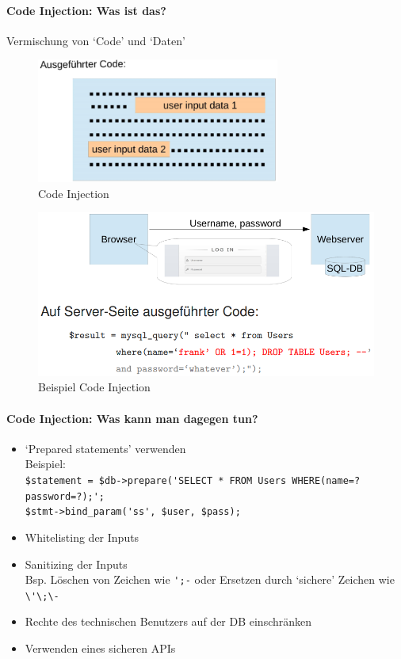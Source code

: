 \documentclass[10pt,a4paper]{article}
\begin{document}
\paragraph*{Code Injection: Was ist das?} Vermischung von `Code' und `Daten'
\begin{figure}[H]
    \begin{center}
    \includegraphics[width=8cm]{images/Code-Injection.png}
    \caption{Code Injection}
    \label{Code Injection}
    \end{center}
\end{figure}

\begin{figure}[H]
    \begin{center}
    \includegraphics[width=12cm]{images/Bsp-Code-Injection.png}
    \caption{Beispiel Code Injection}
    \label{Code Injection example}
    \end{center}
\end{figure}

\paragraph*{Code Injection: Was kann man dagegen tun?}
\begin{itemize}[noitemsep,topsep=0pt,leftmargin=*]
    \item `Prepared statements' verwenden \\ Beispiel:\\
    \verb|$statement = $db->prepare('SELECT * FROM Users WHERE(name=? password=?);';|\\
    \verb|$stmt->bind_param('ss', $user, $pass);|
    \item Whitelisting der Inputs
    \item Sanitizing der Inputs \\ Bsp. Löschen von Zeichen wie \verb|';-| oder Ersetzen durch `sichere' Zeichen wie \verb|\'\;\-|
    \item Rechte des technischen Benutzers auf der DB einschränken
    \item Verwenden eines sicheren APIs
\end{itemize}
\end{document}
